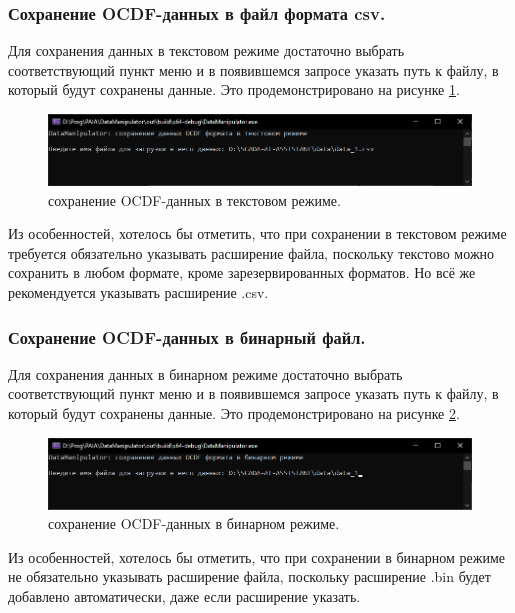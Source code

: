 \subsubsection{ \standartTitleFont
  Сохранение OCDF-данных в файл формата csv.
} \label{subsubsec:OCDFSafeCSV}

{\standartFont

  \par Для сохранения данных в текстовом режиме достаточно выбрать соответствующий пункт меню и в появившемся запросе указать путь к файлу, в который будут сохранены данные. Это продемонстрировано на рисунке \ref{fig:OCDFsafeCSV}.

  \begin{figure}[H]
    \centering
    \includegraphics[width=\textwidth]{images/forDataManipulator/OCDFsafeCSV.png}
    \caption{сохранение OCDF-данных в текстовом режиме.} 
    \label{fig:OCDFsafeCSV}
  \end{figure}

  \par Из особенностей, хотелось бы отметить, что при сохранении в текстовом режиме требуется обязательно указывать расширение файла, поскольку текстово можно сохранить в любом формате, кроме зарезервированных форматов. Но всё же рекомендуется указывать расширение .csv.
}

\subsubsection{ \standartTitleFont
  Сохранение OCDF-данных в бинарный файл.
} \label{subsubsec:OCDFSafeBIN}

{\standartFont

  \par Для сохранения данных в бинарном режиме достаточно выбрать соответствующий пункт меню и в появившемся запросе указать путь к файлу, в который будут сохранены данные. Это продемонстрировано на рисунке \ref{fig:OCDFsafeBIN}.

  \begin{figure}[H]
    \centering
    \includegraphics[width=\textwidth]{images/forDataManipulator/OCDFsafeBIN.png}
    \caption{сохранение OCDF-данных в бинарном режиме.} 
    \label{fig:OCDFsafeBIN}
  \end{figure}

  \par Из особенностей, хотелось бы отметить, что при сохранении в бинарном режиме не обязательно указывать расширение файла, поскольку расширение .bin будет добавлено автоматически, даже если расширение указать. 
}

